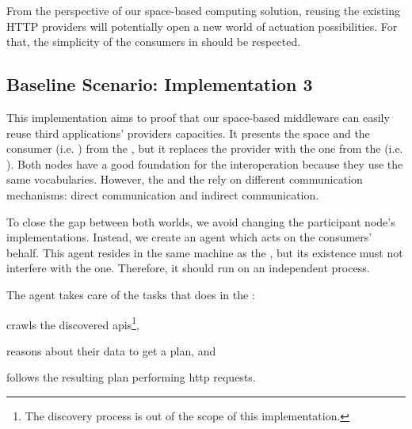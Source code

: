 From the perspective of our space-based computing solution, reusing the existing HTTP providers will potentially open a new world of actuation possibilities.
For that, the simplicity of the consumers in \spaceActuation{} should be respected. %




\subsection{Baseline Scenario: Implementation 3}
\label{sec:actuation_scn3}
\newcommand{\implMix}{\emph{Implementation 3}}

This implementation aims to proof that our space-based middleware can easily reuse third applications' providers capacities. %
It presents the space and the consumer (i.e. \nodeConsSpace{}) from the \implSpace{}, but it replaces the provider with the one from the \implRest{} (i.e. \nodeProvRest{}).
Both nodes have a good foundation for the interoperation because they use the same vocabularies. %
However, the \nodeProvRest{} and the \nodeConsSpace{} rely on different communication mechanisms: direct communication and indirect communication.


To close the gap between both worlds, we avoid changing the participant node's implementations.
Instead, we create an agent which acts on the consumers' behalf. %
This agent resides in the same machine as the \Space{}, but its existence must not interfere with the \Space{} one. %
Therefore, it should run on an independent process.


The agent takes care of the tasks that \nodeConsRest{} does in the \implRest:
\begin{enumerate*}[label=\itshape(\arabic*\upshape)]
  \item crawls the discovered \acsp{api}\footnote{The discovery process is out of the scope of this implementation.},
  \item reasons about their data to get a plan, and
  \item follows the resulting plan performing \acs{http} requests.
\end{enumerate*}


